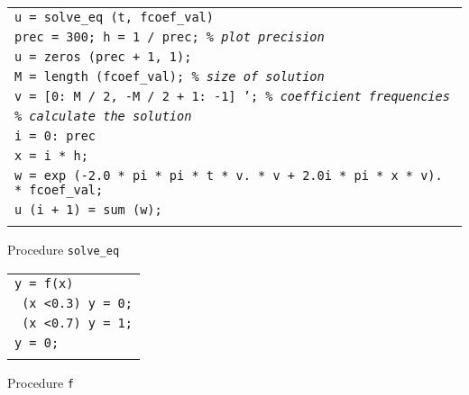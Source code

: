 \begin{listing} \begin{footnotesize}
\noindent
{\upshape
\begin{tabular}{l} \texttt{\pfunction u = solve\_eq (t, fcoef\_val)} \\
\texttt{prec = 300; h = 1 / prec; \textit{\% plot precision}} \\
\texttt{u = zeros (prec + 1, 1);} \\
\texttt{M = length (fcoef\_val); \textit{\% size of solution}} \\
\texttt{v = [0: M / 2, -M / 2 + 1: -1] '; \textit{\% coefficient frequencies}} \\
\texttt{\textit{\% calculate the solution}} \\
\texttt{\pfor i = 0: prec} \\
\quad \texttt{x = i * h;} \\
\quad \texttt{w = exp (-2.0 * pi * pi * t * v. * v + 2.0i * pi * x * v). * fcoef\_val;} \\
\quad \texttt{u (i + 1) = sum (w);} \\
\texttt{\pend} \\
\end{tabular}
}
\noindent \end{footnotesize}
\caption{Procedure \texttt{\upshape solve\_eq}}
\label{listing-solve_eq}
\end{listing}
 
\begin{listing} \begin{footnotesize}
\noindent
{\upshape
\begin{tabular}{l} \texttt{\pfunction y = f(x)} \\
\texttt{\pif{} (x <0.3) y = 0;} \\
\texttt{\pelseif{} (x <0.7) y = 1;} \\
\texttt{\pelse y = 0;} \\
\texttt{\pend} \\
\end{tabular}
} 
\noindent \end{footnotesize}
\caption{Procedure \texttt{\upshape f}}
\label{listing-f-heat}
\end{listing}

